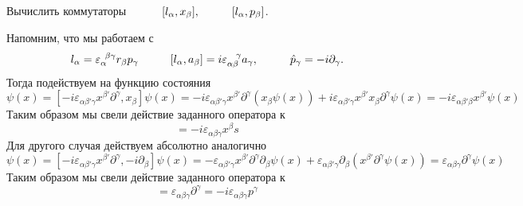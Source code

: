 \begin{leftrules}
	Вычислить коммутаторы $\hspace{1 cm} [l_\alpha, x_\beta],
		\hspace{1 cm}
		[l_\alpha, p_\beta]$.
\end{leftrules}
Напомним, что мы работаем с
\begin{equation*}
	l_\alpha = \varepsilon_{\alpha}^{\phantom{0} \beta \gamma} r_\beta p_\gamma
	\hspace{1 cm}
	[l_\alpha, a_\beta] = i \varepsilon_{\alpha \beta }^{\phantom{0}\phantom{0}\gamma} a_\gamma,
	\hspace{1 cm}
	\hat{p}_\gamma = - i \partial_\gamma.
\end{equation*}
Тогда подействуем на функцию состояния
\begin{equation*}
	[l_\alpha, x_\beta] \psi(x)= [ - i \varepsilon_{\alpha \beta' \gamma} x^{\beta'} \partial^{\gamma}, x_\beta] \psi(x)
	=
	- i \varepsilon_{\alpha \beta' \gamma} x^{\beta'} \partial^\gamma (x_\beta \psi(x)) + i \varepsilon_{\alpha \beta' \gamma} x^{\beta'} x_\beta \partial^\gamma \psi(x)
	=
	- i \varepsilon_{\alpha \beta' \beta} x^{\beta'} \psi(x)
\end{equation*}
Таким образом мы свели действие заданного оператора к
\begin{equation*}
	[l_\alpha, x_\beta] = - i \varepsilon_{\alpha \beta \gamma} x^{\beta}s
\end{equation*}
Для другого случая действуем абсолютно аналогично
\begin{equation*}
	[l_\alpha, p_\beta] \psi(x)
	=
	[ - i \varepsilon_{\alpha \beta' \gamma} x^{\beta'} \partial^{\gamma}, -i \partial_\beta] \psi(x)
	=
	-\varepsilon_{\alpha \beta' \gamma} x^{\beta'} \partial^{\gamma} \partial_\beta \psi(x)
	+ \varepsilon_{\alpha \beta' \gamma} \partial_\beta (x^{\beta'} \partial^{\gamma} \psi(x))
	=
	\varepsilon_{\alpha \beta \gamma}  \partial^{\gamma} \psi(x)
\end{equation*}
Таким образом мы свели действие заданного оператора к
\begin{equation*}
	[l_\alpha, p_\beta] = \varepsilon_{\alpha \beta \gamma}  \partial^{\gamma} = - i \varepsilon_{\alpha \beta \gamma} p^\gamma
\end{equation*}